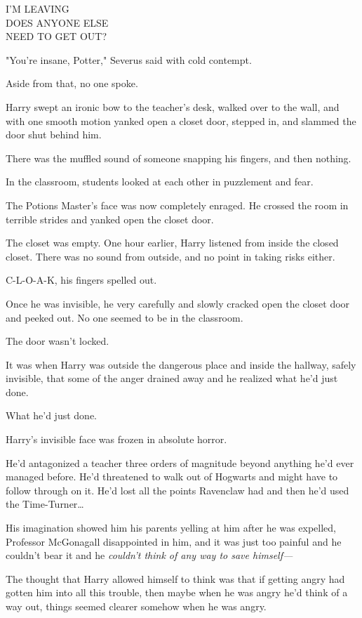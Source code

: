 I'M LEAVING\\
DOES ANYONE ELSE\\
NEED TO GET OUT?

"You're insane, Potter," Severus said with cold contempt.

Aside from that, no one spoke.

Harry swept an ironic bow to the teacher's desk, walked over to the wall, and 
with one smooth motion yanked open a closet door, stepped in, and slammed the 
door shut behind him.

There was the muffled sound of someone snapping his fingers, and then nothing.

In the classroom, students looked at each other in puzzlement and fear.

The Potions Master's face was now completely enraged. He crossed the room in 
terrible strides and yanked open the closet door.

The closet was empty.
\sbreak
One hour earlier, Harry listened from inside the closed closet. There was no 
sound from outside, and no point in taking risks either.

C-L-O-A-K, his fingers spelled out.

Once he was invisible, he very carefully and slowly cracked open the closet 
door and peeked out. No one seemed to be in the classroom.

The door wasn't locked.

It was when Harry was outside the dangerous place and inside the hallway, 
safely invisible, that some of the anger drained away and he realized what he'd 
just done.

What he'd just done.

Harry's invisible face was frozen in absolute horror.

He'd antagonized a teacher three orders of magnitude beyond anything he'd ever 
managed before. He'd threatened to walk out of Hogwarts and might have to 
follow through on it. He'd lost all the points Ravenclaw had and then he'd used 
the Time-Turner{\ldots}

His imagination showed him his parents yelling at him after he was expelled, 
Professor McGonagall disappointed in him, and it was just too painful and he 
couldn't bear it and he \emph{couldn't think of any way to save himself---}

The thought that Harry allowed himself to think was that if getting angry had 
gotten him into all this trouble, then maybe when he was angry he'd think of a 
way out, things seemed clearer somehow when he was angry.

